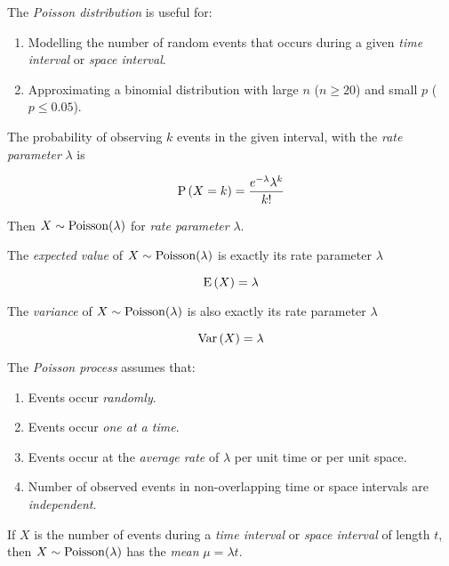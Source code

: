 \begin{definition}
    The \textit{Poisson distribution} is useful for:
    
    \begin{enumerate}
        \item Modelling the number of random events that occurs during a given \textit{time interval} or \textit{space interval}.
        \item Approximating a binomial distribution with large $n$ ($n \ge 20$) and small $p$ ($p \le 0.05$).
    \end{enumerate}
    
    The probability of observing $k$ events in the given interval, with the \textit{rate parameter} $\lambda$ is
    
    \begin{equation}
        \mathrm{P} \left( X = k \right) = \frac{e^{-\lambda} \lambda^k}{k!}
    \end{equation}
    
    Then $X \sim \mathrm{Poisson}(\lambda)$ for \textit{rate parameter} $\lambda$.
    
    The \textit{expected value} of $X \sim \mathrm{Poisson}(\lambda)$ is exactly its rate parameter $\lambda$
    
    \begin{equation}
        \mathrm{E} \left( X \right) = \lambda
    \end{equation}
    
    The \textit{variance} of $X \sim \mathrm{Poisson}(\lambda)$ is also exactly its rate parameter $\lambda$
    
    \begin{equation}
        \mathrm{Var} \left( X \right) = \lambda
    \end{equation}
\end{definition}

\begin{definition}
    The \textit{Poisson process} assumes that:
    
    \begin{enumerate}
        \item Events occur \textit{randomly}.
        \item Events occur \textit{one at a time}.
        \item Events occur at the \textit{average rate} of $\lambda$ per unit time or per unit space.
        \item Number of observed events in non-overlapping time or space intervals are \textit{independent}.
    \end{enumerate}
    
    If $X$ is the number of events during a \textit{time interval} or \textit{space interval} of length $t$, then $X \sim \mathrm{Poisson}(\lambda)$ has the \textit{mean} $\mu = \lambda t$.
\end{definition}

